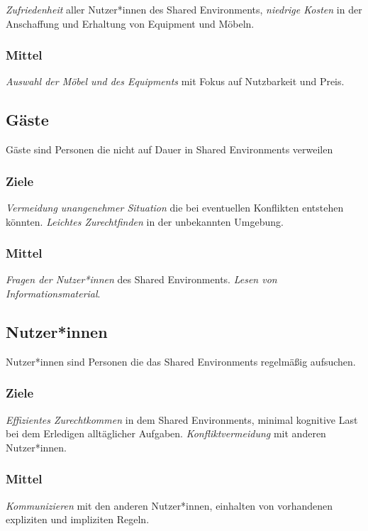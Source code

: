 \documentclass{article}
\begin{document}
\emph{Zufriedenheit} aller Nutzer*innen des Shared Environments, \emph{niedrige Kosten} in der Anschaffung und Erhaltung von Equipment und Möbeln.

\subsubsection*{Mittel}

\emph{Auswahl der Möbel und des Equipments} mit Fokus auf Nutzbarkeit und Preis. 

\subsection{Gäste}

Gäste sind Personen die nicht auf Dauer in Shared Environments verweilen

\subsubsection*{Ziele}
\emph{Vermeidung unangenehmer Situation} die bei eventuellen Konflikten entstehen könnten. \emph{Leichtes Zurechtfinden} in der unbekannten Umgebung. 

\subsubsection*{Mittel}
\emph{Fragen der Nutzer*innen} des Shared Environments. \emph{Lesen von Informationsmaterial}.  

\subsection{Nutzer*innen}

Nutzer*innen sind Personen die das Shared Environments regelmäßig aufsuchen.

\subsubsection*{Ziele}
\emph{Effizientes Zurechtkommen} in dem Shared Environments, minimal kognitive Last bei dem Erledigen alltäglicher Aufgaben. \emph{Konfliktvermeidung} mit anderen Nutzer*innen.

\subsubsection*{Mittel}
\emph{Kommunizieren} mit den anderen Nutzer*innen, einhalten von vorhandenen expliziten und impliziten Regeln.
\end{document}
